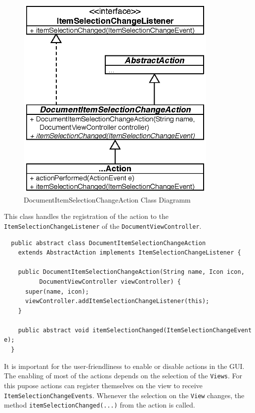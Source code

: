 \begin{figure}[H]
\begin{center}
  \includegraphics[height=3.97in, width=3.85in]{../images/finalreport/application_action.eps}
\caption{DocumentItemSelectionChangeAction Class Diagramm}
\label{application_application_action}
\end{center}
\end{figure}

This class handles the registration of the action to the \texttt{Item\-Selection\-Change\-Listener} of  the \texttt{Document\-View\-Controller}.

\begin{verbatim}
  public abstract class DocumentItemSelectionChangeAction
    extends AbstractAction implements ItemSelectionChangeListener {
  
    public DocumentItemSelectionChangeAction(String name, Icon icon,
          DocumentViewController viewController) {
      super(name, icon);
      viewController.addItemSelectionChangeListener(this);
    }
    
    public abstract void itemSelectionChanged(ItemSelectionChangeEvent e);
  }
\end{verbatim}

It is important for the user-friendliness to enable or disable actions in the GUI. The enabling of most of the actions depends on the selection of the \texttt{Views}. For this pupose actions can register themselves on the view to receive \texttt{Item\-Selection\-Change\-Events}. Whenever the selection on the \texttt{View} changes, the method \texttt{itemSelectionChanged(...)} from the action is called.

